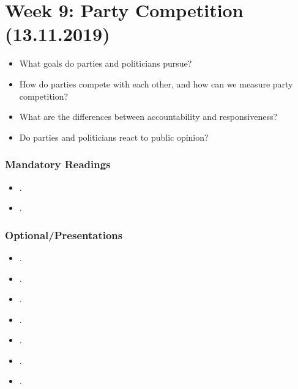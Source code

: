 \documentclass[abstract=on,parskip=full,headings=standardclasses,fontsize=11pt,paper=a4]{scrartcl}
\begin{document}
\section{Week 9:  Party Competition (13.11.2019)}

\begin{itemize}
\renewcommand\labelitemi{--}
\item What goals do parties and politicians pursue?
\item How do parties compete with each other, and how can we measure party competition?
\item What are the differences between accountability and responsiveness?
\item Do parties and politicians react to public opinion? 
\end{itemize}

\subsubsection*{Mandatory Readings}
\begin{itemize}
\item {}.
\item {}.

\end{itemize}

\subsubsection*{Optional/Presentations}
\begin{itemize}
\item {}.
\item {}.
\item {}.
\item {}.
\item {}.
\item {}.
\item {}.
\end{itemize}
\end{document}
